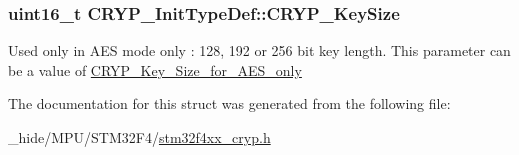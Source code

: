 \subsubsection[{C\+R\+Y\+P\+\_\+\+Key\+Size}]{\setlength{\rightskip}{0pt plus 5cm}uint16\+\_\+t C\+R\+Y\+P\+\_\+\+Init\+Type\+Def\+::\+C\+R\+Y\+P\+\_\+\+Key\+Size}\label{struct_c_r_y_p___init_type_def_ace9e0f21c16a2280a6d7325517c2a9b5}
Used only in A\+E\+S mode only \+: 128, 192 or 256 bit key length. This parameter can be a value of \hyperlink{group___c_r_y_p___key___size__for___a_e_s__only}{C\+R\+Y\+P\+\_\+\+Key\+\_\+\+Size\+\_\+for\+\_\+\+A\+E\+S\+\_\+only} 

The documentation for this struct was generated from the following file\+:\begin{DoxyCompactItemize}
\item 
\+\_\+hide/\+M\+P\+U/\+S\+T\+M32\+F4/\hyperlink{stm32f4xx__cryp_8h}{stm32f4xx\+\_\+cryp.\+h}\end{DoxyCompactItemize}
